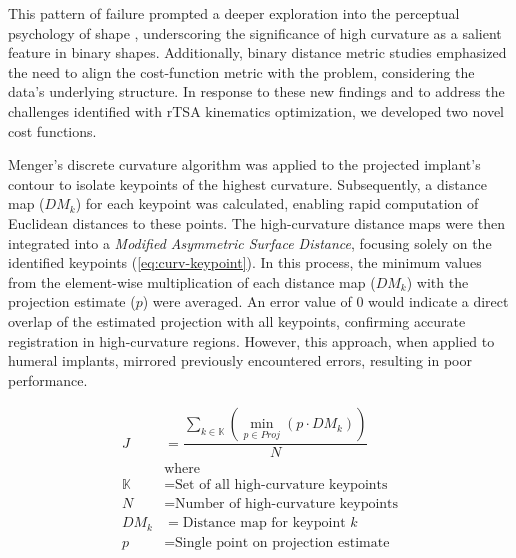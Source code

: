 This pattern of failure prompted a deeper exploration into the perceptual psychology of shape \cite{attneaveInformationalAspectsVisual1954,attneaveQuantitativeStudyShape1956}, underscoring the significance of high curvature as a salient feature in binary shapes.
Additionally, binary distance metric studies \cite{reinkeCommonLimitationsImage2023,reinkeUnderstandingMetricrelatedPitfalls2023} emphasized the need to align the cost-function metric with the problem, considering the data's underlying structure.
In response to these new findings and to address the challenges identified with rTSA kinematics optimization, we developed two novel cost functions.


Menger’s discrete curvature algorithm \cite{legerMengerCurvatureRectifiability1999} was applied to the projected implant's contour to isolate keypoints of the highest curvature.
Subsequently, a distance map ($DM_{k}$) for each keypoint was calculated, enabling rapid computation of Euclidean distances to these points.
The high-curvature distance maps were then integrated into a \emph{Modified Asymmetric Surface Distance}, focusing solely on the identified keypoints (\cref{eq:curv-keypoint}).
In this process, the minimum values from the element-wise multiplication of each distance map ($DM_{k}$) with the projection estimate ($p$) were averaged.
An error value of 0 would indicate a direct overlap of the estimated projection with all keypoints, confirming accurate registration in high-curvature regions.
However, this approach, when applied to humeral implants, mirrored previously encountered errors, resulting in poor performance.

\begin{equation}
	\label{eq:curv-keypoint}
	\begin{split}
		\displaystyle J & = \dfrac{\sum_{k \in \mathbb{K}}(\min_{p\in Proj}(p \cdot DM_{k}))}{N} \\
		                & \text{where}                                                           \\
		\mathbb{K}      & = \text{Set of all high-curvature keypoints}                           \\
		N               & = \text{Number of high-curvature keypoints}                            \\
		DM_{k}          & = \text{Distance map for keypoint $k$}                                 \\
		p               & = \text{Single point on projection estimate}
	\end{split}
\end{equation}


